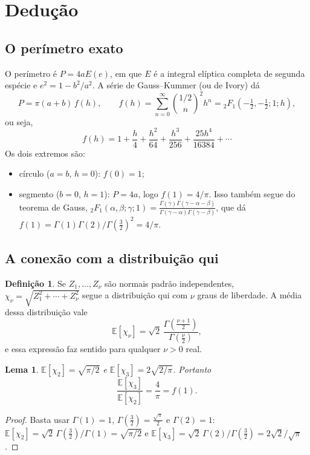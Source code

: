 \documentclass[11pt,a4paper]{article}
\newtheorem{lema}[teorema]{Lema}
\theoremstyle{definition}
\newtheorem{definicao}[teorema]{Definição}
\theoremstyle{remark}
\newcommand{\E}{\mathbb{E}}
\begin{document}
\section{Dedução}

\subsection{O perímetro exato}

O perímetro é $P=4aE(e)$, em que $E$ é a integral elíptica completa de segunda
espécie e $e^2=1-b^2/a^2$. A série de Gauss--Kummer (ou de Ivory) dá
\begin{equation}\label{eq:serie}
  P=\pi(a+b)\,f(h),\qquad
  f(h)=\sum_{n=0}^{\infty}\binom{1/2}{n}^{\!2}h^{n}
  ={}_2F_1\!\left(-\tfrac12,-\tfrac12;1;h\right),
\end{equation}
ou seja,
\begin{equation}
  f(h)=1+\frac{h}{4}+\frac{h^2}{64}+\frac{h^3}{256}+\frac{25h^4}{16384}+\cdots
\end{equation}
Os dois extremos são:
\begin{itemize}
  \item círculo ($a=b$, $h=0$): $f(0)=1$;
  \item segmento ($b=0$, $h=1$): $P=4a$, logo $f(1)=4/\pi$. Isso também segue do
  teorema de Gauss, ${}_2F_1(\alpha,\beta;\gamma;1)=
  \frac{\Gamma(\gamma)\Gamma(\gamma-\alpha-\beta)}{\Gamma(\gamma-\alpha)\Gamma(\gamma-\beta)}$, que dá
  $f(1)=\Gamma(1)\Gamma(2)/\Gamma(\tfrac32)^2=4/\pi$.
\end{itemize}

\subsection{A conexão com a distribuição qui}

\begin{definicao}
Se $Z_1,\dots,Z_\nu$ são normais padrão independentes, $\chi_\nu=\sqrt{Z_1^2+\cdots+Z_\nu^2}$
segue a distribuição qui com $\nu$ graus de liberdade. A média dessa distribuição vale
\begin{equation}
  \E[\chi_\nu]=\sqrt{2}\,\frac{\Gamma\!\left(\frac{\nu+1}{2}\right)}{\Gamma\!\left(\frac{\nu}{2}\right)},
\end{equation}
e essa expressão faz sentido para qualquer $\nu>0$ real.
\end{definicao}

\begin{lema}\label{lema:chi}
$\E[\chi_2]=\sqrt{\pi/2}$ e $\E[\chi_3]=2\sqrt{2/\pi}$. Portanto
\[
  \frac{\E[\chi_3]}{\E[\chi_2]}=\frac{4}{\pi}=f(1).
\]
\end{lema}
\begin{proof}
Basta usar $\Gamma(1)=1$, $\Gamma(\tfrac32)=\tfrac{\sqrt\pi}{2}$ e $\Gamma(2)=1$:
$\E[\chi_2]=\sqrt2\,\Gamma(\tfrac32)/\Gamma(1)=\sqrt{\pi/2}$ e
$\E[\chi_3]=\sqrt2\,\Gamma(2)/\Gamma(\tfrac32)=2\sqrt2/\sqrt\pi$.
\end{proof}
\end{document}
